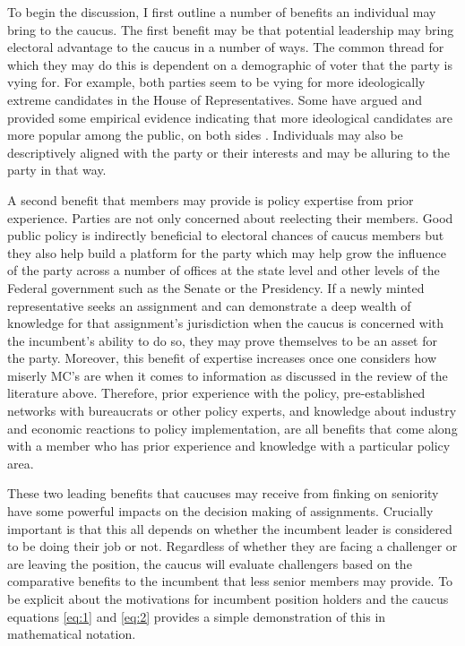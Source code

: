 \documentclass [12pt]{article}
\begin{document}
To begin the discussion, I first outline a number of benefits an individual may bring to the caucus. The first benefit may be that potential leadership may bring electoral advantage to the caucus in a number of ways. The common thread for which they may do this is dependent on a demographic of voter that the party is vying for. For example, both parties seem to be vying for more ideologically extreme candidates in the House of Representatives. Some have argued and provided some empirical evidence indicating that more ideological candidates are more popular among the public, on both sides \cite{Utych2019}. Individuals may also be descriptively aligned with the party or their interests and may be alluring to the party in that way. 

A second benefit that members may provide is policy expertise from prior experience. Parties are not only concerned about reelecting their members. Good public policy is indirectly beneficial to electoral chances of caucus members but they also help build a platform for the party which may help grow the influence of the party across a number of offices at the state level and other levels of the Federal government such as the Senate or the Presidency. If a newly minted representative seeks an assignment and can demonstrate a deep wealth of knowledge for that assignment's jurisdiction when the caucus is concerned with the incumbent's ability to do so, they may prove themselves to be an asset for the party. Moreover, this benefit of expertise increases once one considers how miserly MC's are when it comes to information as discussed in the review of the literature above. Therefore, prior experience with the policy, pre-established networks with bureaucrats or other policy experts, and knowledge about industry and economic reactions to policy implementation, are all benefits that come along with a member who has prior experience and knowledge with a particular policy area. 

These two leading benefits that caucuses may receive from finking on seniority have some powerful impacts on the decision making of assignments. Crucially important is that this all depends on whether the incumbent leader is considered to be doing their job or not. Regardless of whether they are facing a challenger or are leaving the position, the caucus will evaluate challengers based on the comparative benefits to the incumbent that less senior members may provide. To be explicit about the motivations for incumbent position holders and the caucus equations \ref{eq:1} and \ref{eq:2} provides a simple demonstration of this in mathematical notation. 
\end{document}
